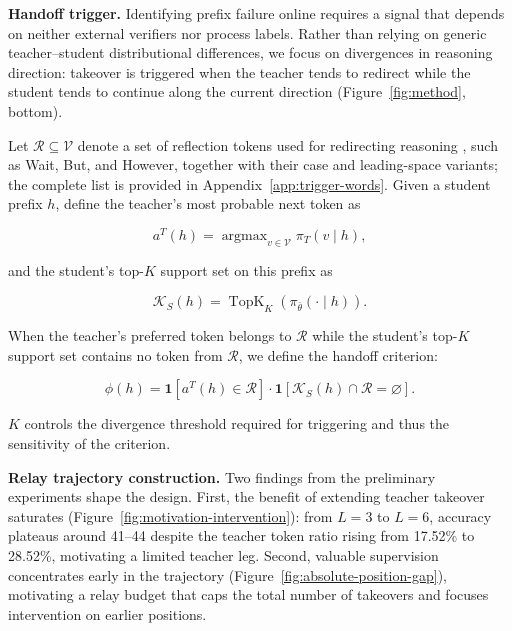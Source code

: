 \documentclass{article} %
\begin{document}
\textbf{Handoff trigger.} Identifying prefix failure online requires a signal that depends on neither external verifiers nor process labels. Rather than relying on generic teacher--student distributional differences, we focus on divergences in reasoning direction: takeover is triggered when the teacher tends to redirect while the student tends to continue along the current direction (Figure~\ref{fig:method}, bottom).\par

Let $\mathcal R\subseteq\mathcal V$ denote a set of reflection tokens used for redirecting reasoning \citep{guo2025deepseek,muennighoff2025s1}, such as Wait, But, and However, together with their case and leading-space variants; the complete list is provided in Appendix~\ref{app:trigger-words}. Given a student prefix $h$, define the teacher's most probable next token as\par

\begin{equation}
a^T(h)=\mathop{\arg\max}_{v\in\mathcal V}\pi_T(v\mid h),
\end{equation}

and the student's top-$K$ support set on this prefix as\par

\begin{equation}
\mathcal K_S(h)
=\operatorname{TopK}_K\!\left(\pi_{\bar\theta}(\cdot\mid h)\right).
\end{equation}

When the teacher's preferred token belongs to $\mathcal R$ while the student's top-$K$ support set contains no token from $\mathcal R$, we define the handoff criterion:\par

\begin{equation}
\phi(h)
=\mathbf 1[a^T(h)\in\mathcal R]
\cdot
\mathbf 1[\mathcal K_S(h)\cap\mathcal R=\varnothing].
\end{equation}

$K$ controls the divergence threshold required for triggering and thus the sensitivity of the criterion.\par

\textbf{Relay trajectory construction.} Two findings from the preliminary experiments shape the design. First, the benefit of extending teacher takeover saturates (Figure~\ref{fig:motivation-intervention}): from $L=3$ to $L=6$, accuracy plateaus around 41--44 despite the teacher token ratio rising from 17.52\% to 28.52\%, motivating a limited teacher leg. Second, valuable supervision concentrates early in the trajectory (Figure~\ref{fig:absolute-position-gap}), motivating a relay budget that caps the total number of takeovers and focuses intervention on earlier positions.\par
\end{document}
